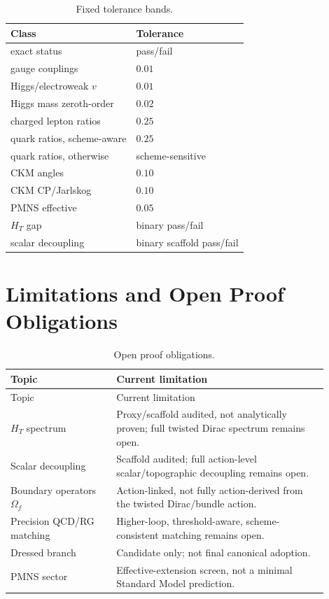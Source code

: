 \documentclass[11pt]{article}
\newcommand{\HT}{\ensuremath{H_T}}
\begin{document}
\begin{table}[htbp]
\centering
\caption{Fixed tolerance bands.}
\small
\begin{tabular}{@{}ll@{}}
\toprule
Class & Tolerance \\
\midrule
exact status & pass/fail \\
gauge couplings & $0.01$ \\
Higgs/electroweak $v$ & $0.01$ \\
Higgs mass zeroth-order & $0.02$ \\
charged lepton ratios & $0.25$ \\
quark ratios, scheme-aware & $0.25$ \\
quark ratios, otherwise & scheme-sensitive \\
CKM angles & $0.10$ \\
CKM CP/Jarlskog & $0.10$ \\
PMNS effective & $0.05$ \\
\HT{} gap & binary pass/fail \\
scalar decoupling & binary scaffold pass/fail \\
\bottomrule
\end{tabular}
\end{table}

\section{Limitations and Open Proof Obligations}

\begingroup
\small
\begin{longtable}{@{}L{0.30\linewidth}L{0.60\linewidth}@{}}
\caption{Open proof obligations.}\\
\toprule
Topic & Current limitation \\
\midrule
\endfirsthead
\toprule
Topic & Current limitation \\
\midrule
\endhead
\HT{} spectrum & Proxy/scaffold audited, not analytically proven; full twisted Dirac spectrum remains open. \\
Scalar decoupling & Scaffold audited; full action-level scalar/topographic decoupling remains open. \\
Boundary operators $\Omega_f$ & Action-linked, not fully action-derived from the twisted Dirac/bundle action. \\
Precision QCD/RG matching & Higher-loop, threshold-aware, scheme-consistent matching remains open. \\
Dressed branch & Candidate only; not final canonical adoption. \\
PMNS sector & Effective-extension screen, not a minimal Standard Model prediction. \\
\bottomrule
\end{longtable}
\endgroup
\end{document}
